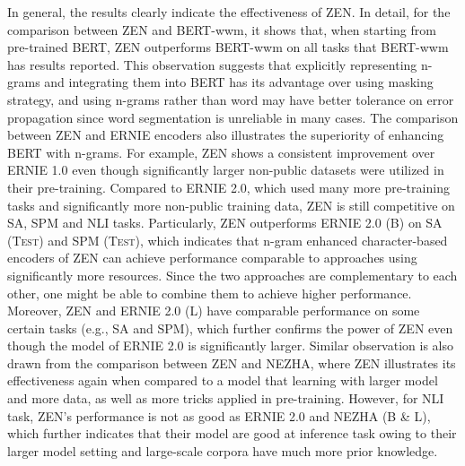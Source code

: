 \documentclass[11pt,a4paper]{article}
\begin{document}
\begin{CJK}{UTF8}{gbsn}
In general, the results clearly indicate the effectiveness of ZEN.
In detail, for the comparison between ZEN and BERT-wwm, it shows that, when starting from pre-trained BERT, ZEN outperforms BERT-wwm on all tasks that BERT-wwm has results reported.
This observation suggests that explicitly representing n-grams and integrating them into BERT has its advantage over using masking strategy,
and using n-grams rather than word may have better tolerance on error propagation since word segmentation is unreliable in many cases.
The comparison between ZEN and ERNIE encoders also illustrates the superiority of enhancing BERT with n-grams.
For example, ZEN shows a consistent improvement over ERNIE 1.0 even though significantly larger non-public datasets were utilized in their pre-training.
Compared to ERNIE 2.0, which used many more pre-training tasks and significantly more non-public training data, 
ZEN is still competitive on SA, SPM and NLI tasks.
Particularly,
ZEN outperforms ERNIE 2.0 (B) on SA (\textsc{Test}) and SPM (\textsc{Test}), which indicates that n-gram enhanced character-based encoders of ZEN can achieve performance comparable to approaches using significantly more resources.
Since the two approaches are complementary to each other, one might be able to combine them to achieve higher performance. 
Moreover, ZEN and ERNIE 2.0 (L) have comparable performance on some certain tasks (e.g., SA and SPM), which further confirms the power of ZEN even though the model of ERNIE 2.0 is significantly larger. 
Similar observation is also drawn from the comparison between ZEN and NEZHA, where ZEN illustrates its effectiveness again when compared to a model that learning with larger model and more data, as well as more tricks applied in pre-training.
However,
for NLI task, ZEN's performance is not as good as ERNIE 2.0 and NEZHA (B \& L), which further indicates that their model are good at inference task owing to their larger model setting and large-scale corpora have much more prior knowledge.



\end{CJK}
\end{document}
